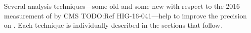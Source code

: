 Several analysis techniques---some old and some new with respect to the 2016 measurement of \mH by CMS TODO:Ref HIG-16-041---help to improve the precision on \mH.
Each technique is individually described in the sections that follow.





% 
